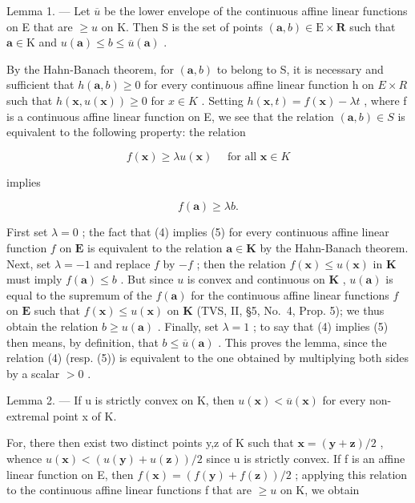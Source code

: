 Lemma 1. --- Let \(\overline{u}\) be the lower envelope of the continuous affine linear functions on E that are \(\geqslant u\) on K. Then S is the set of points \((\mathbf{a}, b) \in \mathrm{E} \times \mathbf{R}\) such that \(\mathbf{a} \in \mathrm{K}\) and \(u(\mathbf{a}) \leqslant b \leqslant \overline{u}(\mathbf{a})\) .

By the Hahn-Banach theorem, for \((\mathbf{a}, b)\) to belong to S, it is necessary and sufficient that \(h(\mathbf{a}, b) \geqslant 0\) for every continuous affine linear function h on \(E \times R\) such that \(h(\mathbf{x}, u(\mathbf{x})) \geqslant 0\) for \(x \in K\) . Setting \(h(\mathbf{x}, t) = f(\mathbf{x}) - \lambda t\) , where f is a continuous affine linear function on E, we see that the relation \((\mathbf{a}, b) \in S\) is equivalent to the following property: the relation

\[
f (\mathbf {x}) \geqslant \lambda u (\mathbf {x}) \quad \text { for   all } \mathbf {x} \in K\tag{4}
\]

implies

\[
f (\mathbf {a}) \geqslant \lambda b.\tag{5}
\]

First set \(\lambda = 0\) ; the fact that (4) implies (5) for every continuous affine linear function \(f\) on \(\mathbf{E}\) is equivalent to the relation \(\mathbf{a} \in \mathbf{K}\) by the Hahn-Banach theorem. Next, set \(\lambda = -1\) and replace \(f\) by \(-f\) ; then the relation \(f(\mathbf{x}) \leqslant u(\mathbf{x})\) in \(\mathbf{K}\) must imply \(f(\mathbf{a}) \leqslant b\) . But since \(u\) is convex and continuous on \(\mathbf{K}\) , \(u(\mathbf{a})\) is equal to the supremum of the \(f(\mathbf{a})\) for the continuous affine linear functions \(f\) on \(\mathbf{E}\) such that \(f(\mathbf{x}) \leqslant u(\mathbf{x})\) on \(\mathbf{K}\) (TVS, II, §5, No.~4, Prop. 5); we thus obtain the relation \(b \geqslant u(\mathbf{a})\) . Finally, set \(\lambda = 1\) ; to say that (4) implies (5) then means, by definition, that \(b \leqslant \overline{u}(\mathbf{a})\) . This proves the lemma, since the relation (4) (resp. (5)) is equivalent to the one obtained by multiplying both sides by a scalar \(>0\) .

Lemma 2. --- If u is strictly convex on K, then \(u(\mathbf{x}) < \overline{u}(\mathbf{x})\) for every non-extremal point x of K.

For, there then exist two distinct points y,z of K such that \(\mathbf{x} = (\mathbf{y} + \mathbf{z})/2\) , whence \(u(\mathbf{x}) < (u(\mathbf{y}) + u(\mathbf{z}))/2\) since u is strictly convex. If f is an affine linear function on E, then \(f(\mathbf{x}) = (f(\mathbf{y}) + f(\mathbf{z}))/2\) ; applying this relation to the continuous affine linear functions f that are \(\geqslant u\) on K, we obtain


